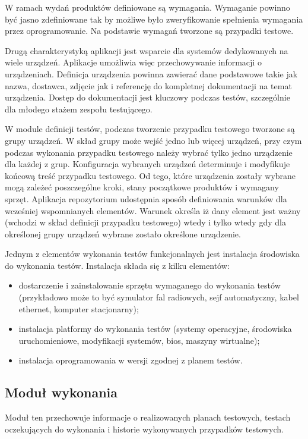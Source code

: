 W ramach wydań produktów definiowane są wymagania. Wymaganie powinno być jasno zdefiniowane tak by możliwe było zweryfikowanie spełnienia wymagania przez oprogramowanie. Na podstawie wymagań tworzone są przypadki testowe.

Drugą charakterystyką aplikacji jest wsparcie dla systemów dedykowanych na wiele urządzeń. Aplikacje umożliwia więc przechowywanie informacji o urządzeniach. Definicja urządzenia powinna zawierać dane podstawowe takie jak nazwa, dostawca, zdjęcie jak i referencję do kompletnej dokumentacji na temat urządzenia. Dostęp do dokumentacji jest kluczowy podczas testów, szczególnie dla młodego stażem zespołu testującego.

W module definicji testów, podczas tworzenie przypadku testowego tworzone są grupy urządzeń. W skład grupy może wejść jedno lub więcej urządzeń, przy czym podczas wykonania przypadku testowego należy wybrać tylko jedno urządzenie dla każdej z grup. Konfiguracja wybranych urządzeń determinuje i modyfikuje końcową treść przypadku testowego. Od tego, które urządzenia zostały wybrane mogą zależeć poszczególne kroki, stany początkowe produktów i wymagany sprzęt. Aplikacja repozytorium udostępnia sposób definiowania warunków dla wcześniej wspomnianych elementów. Warunek określa iż dany element jest ważny (wchodzi w skład definicji przypadku testowego) wtedy i tylko wtedy gdy dla określonej grupy urządzeń wybrane zostało określone urządzenie.

Jednym z elementów wykonania testów funkcjonalnych jest instalacja środowiska do wykonania testów. Instalacja składa się z kilku elementów:
\begin{itemize}
  \item dostarczenie i zainstalowanie sprzętu wymaganego do wykonania testów (przykładowo może to być symulator fal radiowych, sejf automatyczny, kabel ethernet, komputer stacjonarny);
  \item instalacja platformy do wykonania testów (systemy operacyjne, środowiska uruchomieniowe, modyfikacji systemów, bios, maszyny wirtualne);
  \item instalacja oprogramowania w wersji zgodnej z planem testów.
\end{itemize}

\subsection{Moduł wykonania }

Moduł ten przechowuje informacje o realizowanych planach testowych, testach oczekujących do wykonania i historie wykonywanych przypadków testowych.


